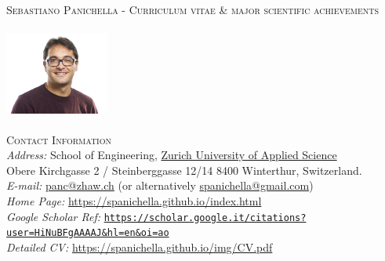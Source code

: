 \documentclass[11pt]{article}
\providecommand*\url[1]{\href{#1}{#1}}
\renewcommand*\url[1]{\href{#1}{\texttt{#1}}}
\providecommand*\email[1]{\href{mailto:#1}{#1}}
\begin{document}
\vspace{-2mm}
\textsc{\fontsize{13}{12}\selectfont Sebastiano Panichella - Curriculum vitae \& major scientific achievements}\\
\vspace{-2mm}


\noindent\begin{minipage}{0.2\textwidth}%
\includegraphics[width=3.4cm, height=3cm]{images/s_panichella.jpg}
\end{minipage}%
\hfill%
\begin{minipage}{0.9\textwidth}\raggedright
\textsc{Contact Information}\\
{\small
\textit{Address:} School of Engineering,  \href{https://www.zhaw.ch/en/about-us/person/panc/}{Zurich University of Applied Science}\\
Obere Kirchgasse 2 / Steinberggasse 12/14
8400 Winterthur, Switzerland.\\
\textit{E-mail:} \email{panc@zhaw.ch} (or alternatively \email{spanichella@gmail.com})\\
\textit{Home Page:} \href{https://spanichella.github.io/index.html}{https://spanichella.github.io/index.html}\\
\textit{Google Scholar Ref:}  \url{https://scholar.google.it/citations?user=HiNuBFgAAAAJ\&hl=en\&oi=ao}\\
\textit{Detailed CV:} \href{https://spanichella.github.io/img/CV.pdf}{https://spanichella.github.io/img/CV.pdf}}\\
\end{minipage}
\end{document}
